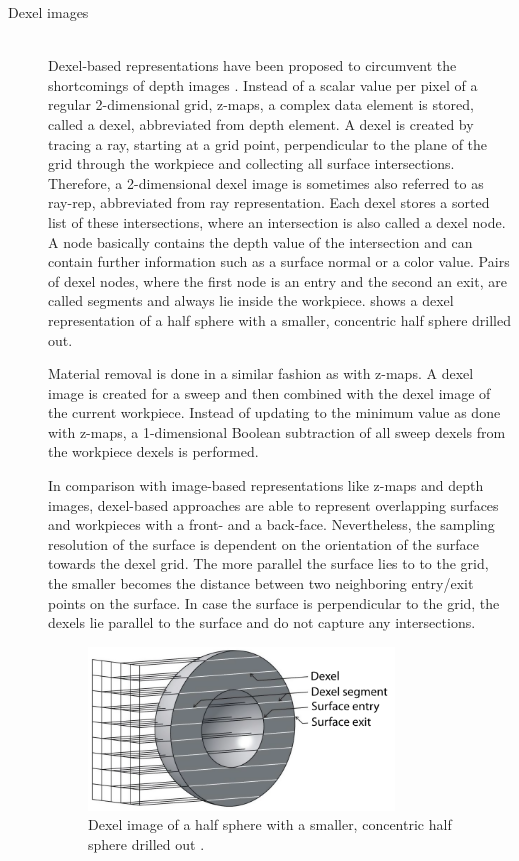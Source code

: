 \begin{description}
	\item[Dexel images] \hfill \\
	Dexel-based representations have been proposed to circumvent the shortcomings of depth images \cite{dexel}.
	Instead of a scalar value per pixel of a regular 2-dimensional grid, \cf z-maps, a complex data element is stored, called a dexel, abbreviated from depth element.
	A dexel is created by tracing a ray, starting at a grid point, perpendicular to the plane of the grid through the workpiece and collecting all surface intersections.
	Therefore, a 2-dimensional dexel image is sometimes also referred to as ray-rep, abbreviated from ray representation.
	Each dexel stores a sorted list of these intersections, where an intersection is also called a dexel node.
	A node basically contains the depth value of the intersection and can contain further information such as a surface normal or a color value.
	Pairs of dexel nodes, where the first node is an entry and the second an exit, are called segments and always lie inside the workpiece.
	 shows a dexel representation of a half sphere with a smaller, concentric half sphere drilled out.

	Material removal is done in a similar fashion as with z-maps.
	A dexel image is created for a sweep and then combined with the dexel image of the current workpiece.
	Instead of updating to the minimum value as done with z-maps, a 1-dimensional Boolean subtraction of all sweep dexels from the workpiece dexels is performed.

	In comparison with image-based representations like z-maps and depth images, dexel-based approaches are able to represent overlapping surfaces and workpieces with a front- and a back-face.
	Nevertheless, the sampling resolution of the surface is dependent on the orientation of the surface towards the dexel grid.
	The more parallel the surface lies to to the grid, the smaller becomes the distance between two neighboring entry/exit points on the surface.
	In case the surface is perpendicular to the grid, the dexels lie parallel to the surface and do not capture any intersections.

	\begin{figure}[H]
		\centering
		\includegraphics[width=0.8\textwidth]{images/dexels}
		\caption[Dexel image]{
			Dexel image of a half sphere with a smaller, concentric half sphere drilled out \cite{virtual_machining_review}.
		}
		\label{fig:dexel_image}
	\end{figure}



\end{description}
